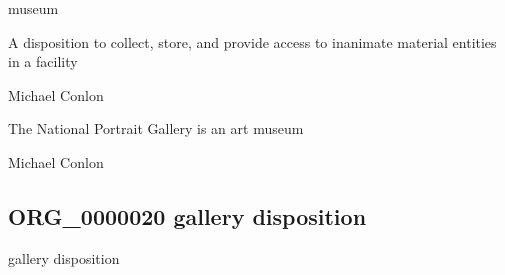\documentclass[letterpaper,10pt,english]{sphinxmanual}
\begin{document}
\begin{sphinxShadowBox}

\sphinxAtStartPar
museum
\end{sphinxShadowBox}

\begin{sphinxShadowBox}

\sphinxAtStartPar
{\hyperref[\detokenize{doc-BFO_0000016::doc}]{}}
\end{sphinxShadowBox}

\begin{sphinxShadowBox}

\sphinxAtStartPar
A disposition to collect, store, and provide access to inanimate material entities in a facility
\end{sphinxShadowBox}

\begin{sphinxShadowBox}

\sphinxAtStartPar
Michael Conlon 
\end{sphinxShadowBox}

\begin{sphinxShadowBox}

\sphinxAtStartPar
The National Portrait Gallery is an art museum
\end{sphinxShadowBox}

\begin{sphinxShadowBox}

\sphinxAtStartPar
Michael Conlon 
\end{sphinxShadowBox}
\begin{quote}

\ignorespaces \end{quote}


\subsection{ORG\_0000020 \sphinxhyphen{} gallery disposition}
\label{\detokenize{doc-ORG_0000020:org-0000020-gallery-disposition}}\label{\detokenize{doc-ORG_0000020:index-0}}\label{\detokenize{doc-ORG_0000020::doc}}
\begin{sphinxShadowBox}

\sphinxAtStartPar
gallery disposition
\end{sphinxShadowBox}
\end{document}
